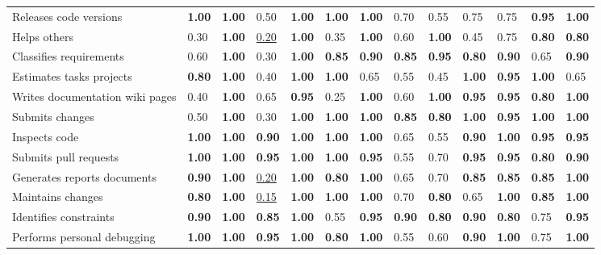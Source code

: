\begin{tabular}{lllllllllllll}
Releases code versions & \textbf{1.00} & \textbf{1.00} & 0.50 & \textbf{1.00} & \textbf{1.00} & \textbf{1.00} & 0.70 & 0.55 & 0.75 & 0.75 & \textbf{0.95} & \textbf{1.00} \\
Helps others & 0.30 & \textbf{1.00} & \underline{0.20} & \textbf{1.00} & 0.35 & \textbf{1.00} & 0.60 & \textbf{1.00} & 0.45 & 0.75 & \textbf{0.80} & \textbf{0.80} \\
Classifies requirements & 0.60 & \textbf{1.00} & 0.30 & \textbf{1.00} & \textbf{0.85} & \textbf{0.90} & \textbf{0.85} & \textbf{0.95} & \textbf{0.80} & \textbf{0.90} & 0.65 & \textbf{0.90} \\
Estimates tasks projects & \textbf{0.80} & \textbf{1.00} & 0.40 & \textbf{1.00} & \textbf{1.00} & 0.65 & 0.55 & 0.45 & \textbf{1.00} & \textbf{0.95} & \textbf{1.00} & 0.65 \\
Writes documentation wiki pages & 0.40 & \textbf{1.00} & 0.65 & \textbf{0.95} & 0.25 & \textbf{1.00} & 0.60 & \textbf{1.00} & \textbf{0.95} & \textbf{0.95} & \textbf{0.80} & \textbf{1.00} \\
Submits changes & 0.50 & \textbf{1.00} & 0.30 & \textbf{1.00} & \textbf{1.00} & \textbf{1.00} & \textbf{0.85} & \textbf{0.80} & \textbf{1.00} & \textbf{0.95} & \textbf{1.00} & \textbf{1.00} \\
Inspects code & \textbf{1.00} & \textbf{1.00} & \textbf{0.90} & \textbf{1.00} & \textbf{1.00} & \textbf{1.00} & 0.65 & 0.55 & \textbf{0.90} & \textbf{1.00} & \textbf{0.95} & \textbf{0.95} \\
Submits pull requests & \textbf{1.00} & \textbf{1.00} & \textbf{0.95} & \textbf{1.00} & \textbf{1.00} & \textbf{0.95} & 0.55 & 0.70 & \textbf{0.95} & \textbf{0.95} & \textbf{0.80} & \textbf{0.90} \\
Generates reports documents & \textbf{0.90} & \textbf{1.00} & \underline{0.20} & \textbf{1.00} & \textbf{0.80} & \textbf{1.00} & 0.65 & 0.70 & \textbf{0.85} & \textbf{0.85} & \textbf{0.85} & \textbf{1.00} \\
Maintains changes & \textbf{0.80} & \textbf{1.00} & \underline{0.15} & \textbf{1.00} & \textbf{1.00} & \textbf{1.00} & 0.70 & \textbf{0.80} & 0.65 & \textbf{1.00} & \textbf{0.85} & \textbf{1.00} \\
Identifies constraints & \textbf{0.90} & \textbf{1.00} & \textbf{0.85} & \textbf{1.00} & 0.55 & \textbf{0.95} & \textbf{0.90} & \textbf{0.80} & \textbf{0.90} & \textbf{0.80} & 0.75 & \textbf{0.95} \\
Performs personal debugging & \textbf{1.00} & \textbf{1.00} & \textbf{0.95} & \textbf{1.00} & \textbf{0.80} & \textbf{1.00} & 0.55 & 0.60 & \textbf{0.90} & \textbf{1.00} & 0.75 & \textbf{1.00} \\

\end{tabular}
